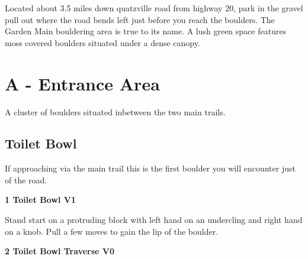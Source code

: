 \raggedcolumns
\begin{multicols}{2}

Located about 3.5 miles down quatzville road from highway 20, park in the gravel pull out where the road bends left just before you reach the boulders. The Garden Main bouldering area is true to its name. A lush green space features moss covered boulders situated under a dense canopy.

\newpage

		\section{A - Entrance Area}\label{sa:Entrance Area}
	\begin{minipage}{\columnwidth}
	A cluster of boulders situated inbetween the two main trails.
	\end{minipage}
	
			\begin{minipage}{\columnwidth}
			\subsection*{Toilet Bowl}\label{bf:Toilet Bowl}
			If approaching via the main trail this is the first boulder you will encounter just of the road.
			
			\end{minipage}
			

					\begin{minipage}{\linewidth}	
					\label{rt:Toilet Bowl}
\colorbox{green!20}{
\parbox{0.95\textwidth}{
\textbf{
1 Toilet Bowl V1   
}
}
}

					\begin{adjustwidth}{0.5cm}{}				
					Stand start on a protruding block with left hand on an undercling and right hand on a knob. Pull a few moves to gain the lip of the boulder.
					\end{adjustwidth}
					\end{minipage}
					\begin{minipage}{\linewidth}	
					\label{rt:Toilet Bowl Traverse}
\colorbox{green!20}{
\parbox{0.95\textwidth}{
\textbf{
2 Toilet Bowl Traverse V0    
}
}
}


\end{minipage}
\end{multicols}
